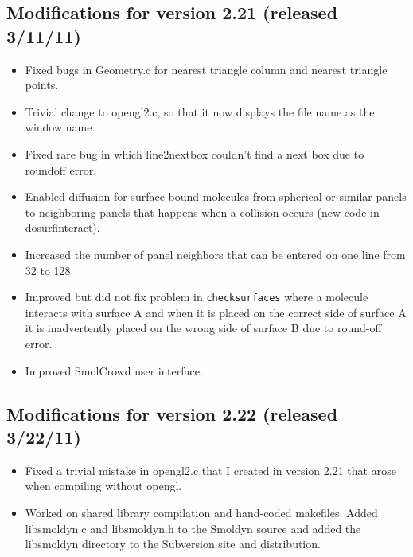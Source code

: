 \documentclass {scrbook}
\newcommand {\ttt} {\texttt}
\begin{document}
\subsection{Modifications for version 2.21 (released 3/11/11)}
\begin{itemize}
\item Fixed bugs in Geometry.c for nearest triangle column and nearest triangle points.
\item Trivial change to opengl2.c, so that it now displays the file name as the window name.
\item Fixed rare bug in which line2nextbox couldn't find a next box due to roundoff error.
\item Enabled diffusion for surface-bound molecules from spherical or similar panels to neighboring panels that happens when a collision occurs (new code in dosurfinteract).
\item Increased the number of panel neighbors that can be entered on one line from 32 to 128.
\item Improved but did not fix problem in \ttt{checksurfaces} where a molecule interacts with surface A and when it is placed on the correct side of surface A it is inadvertently placed on the wrong side of surface B due to round-off error.
\item Improved SmolCrowd user interface.
\end{itemize}

\subsection{Modifications for version 2.22 (released 3/22/11)}
\begin{itemize}
\item Fixed a trivial mistake in opengl2.c that I created in version 2.21 that arose when compiling without opengl.
\item Worked on shared library compilation and hand-coded makefiles. Added libsmoldyn.c and libsmoldyn.h to the Smoldyn source and added the libsmoldyn directory to the Subversion site and distribution.
\end{itemize}
\end{document}

